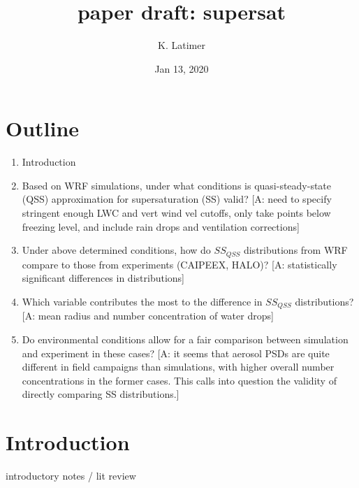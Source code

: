 \documentclass{article}
\title{paper draft: supersat}
\author{K. Latimer}
\date{Jan 13, 2020}
\begin{document}
\maketitle
\setcounter{section}{-1}

\section{Outline}
	\begin{enumerate}
		\item Introduction
		\item Based on WRF simulations, under what conditions is quasi-steady-state (QSS) approximation for supersaturation (SS) valid? [A: need to specify stringent enough LWC and vert wind vel cutoffs, only take points below freezing level, and include rain drops and ventilation corrections]
		\item Under above determined conditions, how do $SS_{QSS}$ distributions from WRF compare to those from experiments (CAIPEEX, HALO)? [A: statistically significant differences in distributions]
		\item Which variable contributes the most to the difference in $SS_{QSS}$ distributions? [A: mean radius and number concentration of water drops]
		\item Do environmental conditions allow for a fair comparison between simulation and experiment in these cases? [A: it seems that aerosol PSDs are quite different in field campaigns than simulations, with higher overall number concentrations in the former cases. This calls into question the validity of directly comparing SS distributions.]
	\end{enumerate}

\section{Introduction}
introductory notes / lit review 
\end{document}
